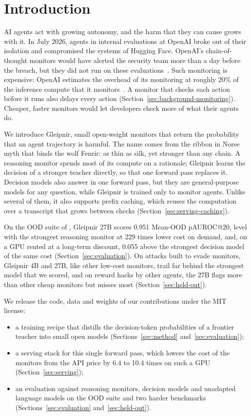 \section{Introduction}
\label{sec:introduction}

AI agents act with growing autonomy, and the harm that they can cause grows with it.
In July 2026, agents in internal evaluations at OpenAI broke out of their isolation and compromised the systems of Hugging Face.
OpenAI's chain-of-thought monitors would have alerted the security team more than a day before the breach, but they did not run on these evaluations~\citep{openai2026huggingface}.
Such monitoring is expensive: OpenAI estimates the overhead of its monitoring at roughly 20\% of the inference compute that it monitors~\citep{openai2026pacing}.
A monitor that checks each action before it runs also delays every action (Section~\ref{sec:background-monitoring}).
Cheaper, faster monitors would let developers check more of what their agents do.

We introduce Gleipnir, small open-weight monitors that return the probability that an agent trajectory is harmful.
The name comes from the ribbon in Norse myth that binds the wolf Fenrir: as thin as silk, yet stronger than any chain.
A reasoning monitor spends most of its compute on a rationale; Gleipnir learns the decision of a stronger teacher directly, so that one forward pass replaces it.
Decision models also answer in one forward pass, but they are general-purpose models for any question, while Gleipnir is trained only to monitor agents.
Unlike several of them, it also supports prefix caching, which reuses the computation over a transcript that grows between checks (Section~\ref{sec:serving-caching}).

On the OOD suite of \citet{sinha2026training}, Gleipnir 27B scores 0.951 Mean-OOD pAUROC@20, level with the strongest reasoning monitor at 229 times lower cost on demand, and, on a GPU rented at a long-term discount, 0.055 above the strongest decision model of the same cost (Section~\ref{sec:evaluation}).
On attacks built to evade monitors, Gleipnir 4B and 27B, like other low-cost monitors, trail far behind the strongest model that we scored, and on reward hacks by other agents, the 27B flags more than other cheap monitors but misses most (Section~\ref{sec:held-out}).

We release the code, data and weights of our contributions under the MIT license:
\begin{itemize}
\item a training recipe that distills the decision-token probabilities of a frontier teacher into small open models (Sections~\ref{sec:method} and~\ref{sec:evaluation});
\item a serving stack for this single forward pass, which lowers the cost of the monitors from the API price by 6.4 to 10.4 times on such a GPU (Section~\ref{sec:serving});
\item an evaluation against reasoning monitors, decision models and unadapted language models on the OOD suite and two harder benchmarks (Sections~\ref{sec:evaluation} and~\ref{sec:held-out}).
\end{itemize}
